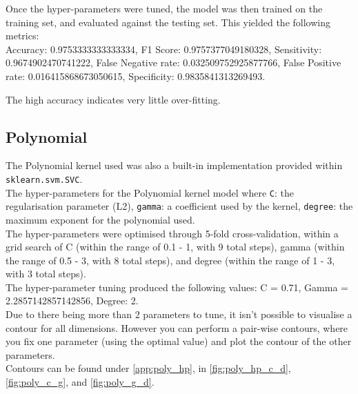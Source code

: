 Once the hyper-parameters were tuned, the model was then trained on the training set, and evaluated against the testing set.
This yielded the following metrics:\\
Accuracy: 0.9753333333333334, 
F1 Score: 0.9757377049180328, 
Sensitivity: 0.9674902470741222, 
False Negative rate: 0.032509752925877766, 
False Positive rate: 0.016415868673050615, 
Specificity: 0.9835841313269493.

The high accuracy indicates very little over-fitting.

\subsection{Polynomial}




The Polynomial kernel used was also a built-in implementation provided within \verb|sklearn.svm.SVC|.\\
The hyper-parameters for the Polynomial kernel model where \verb|C|: the regularisation parameter (L2), \verb|gamma|: a coefficient used by the kernel, \verb|degree|: the maximum exponent for the polynomial used.\\
The hyper-parameters were optimised through 5-fold cross-validation, within a grid search of C (within the range of 0.1 - 1, with 9 total steps), gamma (within the range of 0.5 - 3, with 8 total steps), and degree (within the range of 1 - 3, with 3 total steps).\\
The hyper-parameter tuning produced the following values: C = 0.71, Gamma = 2.2857142857142856, Degree: 2.\\
Due to there being more than 2 parameters to tune, it isn't possible to visualise a contour for all dimensions. However you can perform a pair-wise contours, where you fix one parameter (using the optimal value) and plot the contour of the other parameters.\\ 
Contours can be found under \autoref{app:poly_hp}, in \autoref{fig:poly_hp_c_d}, \autoref{fig:poly_c_g}, and \autoref{fig:poly_g_d}.

